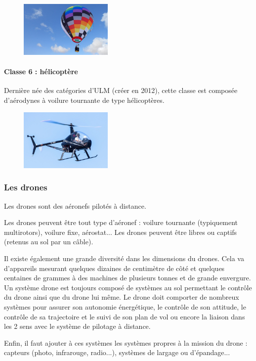 	\begin{figure}[H]
  	\centering
    \includegraphics[width=0.4\textwidth]{01-EtudeAeronefs/img/ULM_Classe_5.jpg}
	\end{figure}	
		
	\paragraph{Classe 6 : hélicoptère}	
	Dernière née des catégories d'ULM (créer en 2012), cette classe est composée d'aérodynes à voilure tournante de type hélicoptères.
	
	\begin{figure}[H]
  	\centering
    \includegraphics[width=0.4\textwidth]{01-EtudeAeronefs/img/ULM_Classe_6.jpg}
	\end{figure}


\subsubsection{Les drones}
Les drones sont des aéronefs pilotés à distance. 

Les drones peuvent être tout type d'aéronef : voilure tournante (typiquement multirotors), voilure fixe, aérostat... Les drones peuvent être libres ou captifs (retenus au sol par un câble).

Il existe également une grande diversité dans les dimensions du drones. Cela va d'appareils mesurant quelques dizaines de centimètre de côté et quelques centaines de grammes à des machines de plusieurs tonnes et de grande envergure. \\

Un système drone est toujours composé de systèmes au sol permettant le contrôle du drone ainsi que du drone lui même. Le drone doit comporter de nombreux systèmes pour assurer son autonomie énergétique, le contrôle de son attitude, le contrôle de sa trajectoire et le suivi de son plan de vol ou encore la liaison dans les 2 sens avec le système de pilotage à distance. 

Enfin, il faut ajouter à ces systèmes les systèmes propres à la mission du drone : capteurs (photo, infrarouge, radio...), systèmes de largage ou d'épandage...

